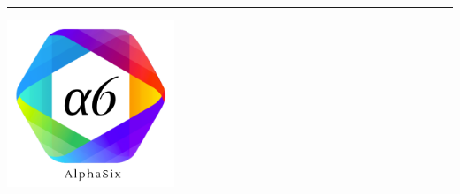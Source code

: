 \begin{center}

\begin{large} \textbf{\progetto} \end{large}
\vspace{0.2em}
\hrule

\vspace{3.5em}

\includegraphics[keepaspectratio = true, width=5cm]{../template/icons/a6.png}


\thispagestyle{empty}

\vspace{1.5em}

\begin{center} 
  \begin{Huge}
  {\fontsize{15mm}{20mm}\selectfont \gruppoLink} 
  \end{Huge}
\end{center}

\vfill

\begin{Huge} \documento \end{Huge}


\end{center}
